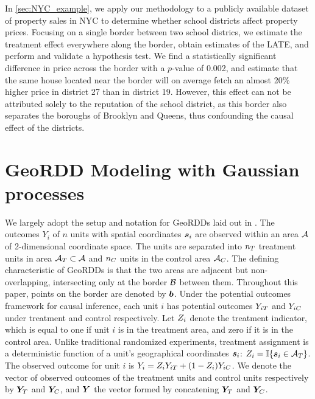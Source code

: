 In \autoref{sec:NYC_example}, we apply our methodology to a publicly available dataset of property sales in NYC to determine whether school districts affect property prices.
Focusing on a single border between two school districs, we estimate the treatment effect everywhere along the border, obtain estimates of the LATE, and perform and validate a hypothesis test.
We find a statistically significant difference in price across the border with a \(p\)-value of 0.002, and estimate that the same house located near the border will on average fetch an almost 20\% higher price in district 27 than in district 19.
However, this effect can not be attributed solely to the reputation of the school district, as this border also separates the boroughs of Brooklyn and Queens, thus confounding the causal effect of the districts.

\section{GeoRDD Modeling with Gaussian processes}
\label{sec:geordd_model}

We largely adopt the setup and notation for GeoRDDs laid out in \cite{keele_titiunik_2015}.
The outcomes \(Y_i\) of \(n\) units with spatial coordinates \(\bm{s}_i\) are observed within an area \(\mathcal{A}\) of 2-dimensional coordinate space.
The units are separated into \(n_T\) treatment units in area \(\mathcal{A}{}_{T} \subset \mathcal{A}\)
and \(n_C\) units in the control area \(\mathcal{A}{}_{C}\).
The defining characteristic of GeoRDDs is that the two areas are adjacent but non-overlapping, intersecting only at the border \(\mathcal{B}\) between them.
Throughout this paper, points on the border are denoted by \(\bm{b}\).
Under the potential outcomes framework for causal inference, each unit \(i\) has potential outcomes \(Y_{iT}\) and \(Y_{iC}\) under treatment and control respectively.
Let \(Z_i\) denote the treatment indicator, which is equal to one if unit \(i\) is in the treatment area, and zero if it is in the control area.
Unlike traditional randomized experiments, treatment assignment is a deterministic function of a unit's geographical coordinates \(\bm{s}_i\): \(\treatind_i = \Ind\cbr{\svec_i \in \treatarea}\).
The observed outcome for unit \(i\) is \(Y_i = Z_i Y_{iT} + (1 - Z_i) Y_{iC}\).
We denote the vector of observed outcomes of the treatment units and control units respectively by \(\bm{Y}_{T}\) and \(\bm{Y}_{C}\), and \(\bm{Y}\) the vector formed by concatening \(\bm{Y}_{T}\) and \(\bm{Y}_{C}\).


